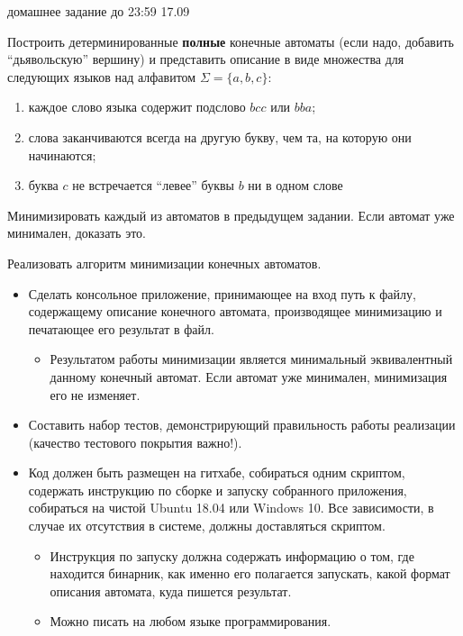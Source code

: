 \documentclass[12pt]{article}
\begin{document}

{\Large домашнее задание до 23:59 17.09}
\bigskip

\enumerate
{
  \item 
  { 
    Построить детерминированные \textbf{полные} конечные автоматы (если надо, добавить ``дьявольскую'' вершину) и представить описание в виде множества для следующих языков над алфавитом $\Sigma = \{ a, b, c \}$:
    \begin{enumerate}
        \item каждое слово языка содержит подслово $bcc$ или $bba$;
        \item слова заканчиваются всегда на другую букву, чем та, на которую они начинаются;
        \item  буква $c$ не встречается ``левее'' буквы $b$ ни в одном слове
    \end{enumerate}
  }
  \item
  {
    Минимизировать каждый из автоматов в предыдущем задании. Если автомат уже минимален, доказать это. 
  }
  \item 
  {
    Реализовать алгоритм минимизации конечных автоматов. 
        \begin{itemize}
        \item Сделать консольное  приложение, принимающее на вход путь к файлу, содержащему описание конечного автомата, производящее минимизацию и печатающее его результат в файл.
        \begin{itemize}
            \item Результатом работы минимизации является минимальный эквивалентный данному конечный автомат. Если автомат уже минимален, минимизация его не изменяет.
        \end{itemize}
        \item Составить набор тестов, демонстрирующий правильность работы реализации (качество тестового покрытия важно!).
        \item Код должен быть размещен на гитхабе, собираться одним скриптом, содержать инструкцию по сборке и запуску собранного приложения, собираться на чистой Ubuntu 18.04 или Windows 10. Все зависимости, в случае их отсутствия в системе, должны доставляться скриптом.
        \begin{itemize}
            \item Инструкция по запуску должна содержать информацию о том, где находится бинарник, как именно его полагается запускать, какой формат описания автомата, куда пишется результат.
            \item Можно писать на любом языке программирования. 
        \end{itemize} 
     \end{itemize}
  }
  
}
\end{document}

